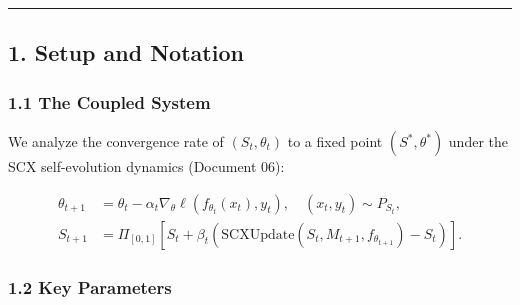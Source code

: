 \documentclass[
  12pt,
]{ctexart}
\begin{document}
\begin{center}\rule{0.5\linewidth}{0.5pt}\end{center}

\subsection{1. Setup and Notation}\label{setup-and-notation}

\subsubsection{1.1 The Coupled System}\label{the-coupled-system}

We analyze the convergence rate of \((S_t, \theta_t)\) to a fixed point
\((S^*, \theta^*)\) under the SCX self-evolution dynamics (Document 06):

\[\begin{aligned}
\theta_{t+1} &= \theta_t - \alpha_t \nabla_\theta \ell(f_{\theta_t}(x_t), y_t), \quad (x_t, y_t) \sim P_{S_t}, \\
S_{t+1} &= \Pi_{[0,1]}[S_t + \beta_t (\text{SCXUpdate}(S_t, M_{t+1}, f_{\theta_{t+1}}) - S_t)].
\end{aligned}\]

\subsubsection{1.2 Key Parameters}\label{key-parameters}
\end{document}
